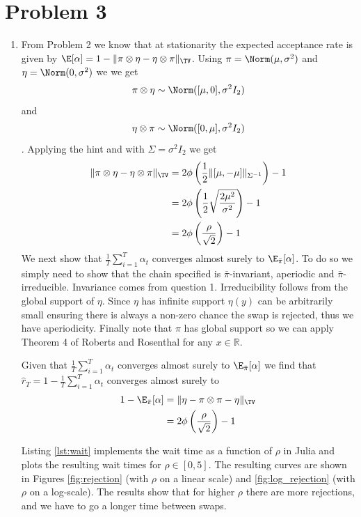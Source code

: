 \documentclass{article}
\begin{document}
\section{Problem 3}
\begin{enumerate}
    \item %
    From Problem 2 we know that at stationarity the expected acceptance
    rate is given by
    $\E[\alpha] = 1-\| \pi \otimes \eta - \eta \otimes \pi \|_{\TV}$. 
    Using $\pi = \Norm(\mu, \sigma^2)$ and $\eta = \Norm(0, \sigma^2)$ we
    we get \[ \pi \otimes \eta \sim \Norm([\mu, 0], \sigma^2 I_2)\] and 
    \[ \eta \otimes \pi \sim \Norm([0, \mu], \sigma^2 I_2)\]. Applying the hint
    and with $\Sigma = \sigma^2 I_2$ we get
    \begin{align}
        \|\pi \otimes \eta - \eta \otimes \pi \|_{\TV} &= 
            2\phi\left(\frac 1 2 \| [\mu, -\mu] \|_{\Sigma^{-1}}\right) - 1 \\
            &= 2\phi\left(\frac 1 2 \sqrt{\frac{2\mu^2}{\sigma^2}}\right) - 1 \\
            &= 2\phi\left(\frac{\rho}{\sqrt{2}}\right) - 1
    \end{align}
    We next show that $\frac{1}{T}\sum_{i=1}^T \alpha_t$ converges almost surely
    to $\E_{\bar\pi}[\alpha]$. To do so we simply need to show that the
    chain specified is $\bar\pi$-invariant, aperiodic and $\bar\pi$-irreducible. Invariance
    comes from question 1. Irreducibility follows from the global support
    of $\eta$. Since $\eta$ has infinite support $\eta(y)$ can be arbitrarily
    small ensuring there is always a non-zero chance the swap is rejected, thus
    we have aperiodicity. Finally note that $\pi$ has global support so we can
    apply Theorem 4 of Roberts and Rosenthal \cite{Roberts_2004} for any $x \in \mathbb R$.

    Given that $\frac{1}{T}\sum_{i=1}^T \alpha_t$ converges almost surely
    to $\E_{\bar\pi}[\alpha]$ we find that 
    $\hat r_T = 1 - \frac{1}{T}\sum_{i=1}^T \alpha_t$ converges almost
    surely to 
    \begin{align}
        1 - \E_{\bar\pi}[\alpha] &= 
            \|\eta - \pi \otimes \pi - \eta\|_{\TV} \\
        &= 2\phi\left(\frac{\rho}{\sqrt{2}}\right) - 1 
    \end{align}

    Listing \ref{lst:wait} implements the wait time as a function of
    $\rho$ in Julia and plots the
    resulting wait times for $\rho \in [0,5]$. The resulting curves are shown in
    Figures \ref{fig:rejection} (with $\rho$ on a linear scale) 
    and \ref{fig:log_rejection} (with $\rho$ on a log-scale). The results show
    that for higher $\rho$ there are more rejections, and we have to go a longer
    time between swaps.


\end{enumerate}
\end{document}
